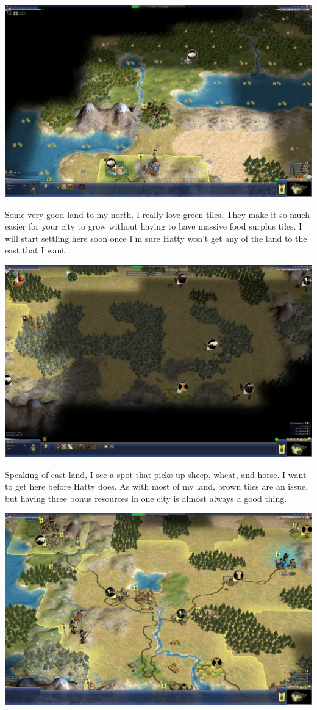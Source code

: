 \documentclass[10pt]{article}
\begin{document}
\includegraphics[width=1.0\textwidth]{43}

Some very good land to my north. I really love green tiles. They make it so much easier for your city
to grow without having to have massive food surplus tiles. I will start settling here soon once I'm sure
Hatty won't get any of the land to the east that I want.

\includegraphics[width=1.0\textwidth]{46}

Speaking of east land, I see a spot that picks up sheep, wheat, and horse. I want to get here before
Hatty does. As with most of my land, brown tiles are an issue, but having three bonus resources in
one city is almost always a good thing.

\includegraphics[width=1.0\textwidth]{48}
\end{document}
